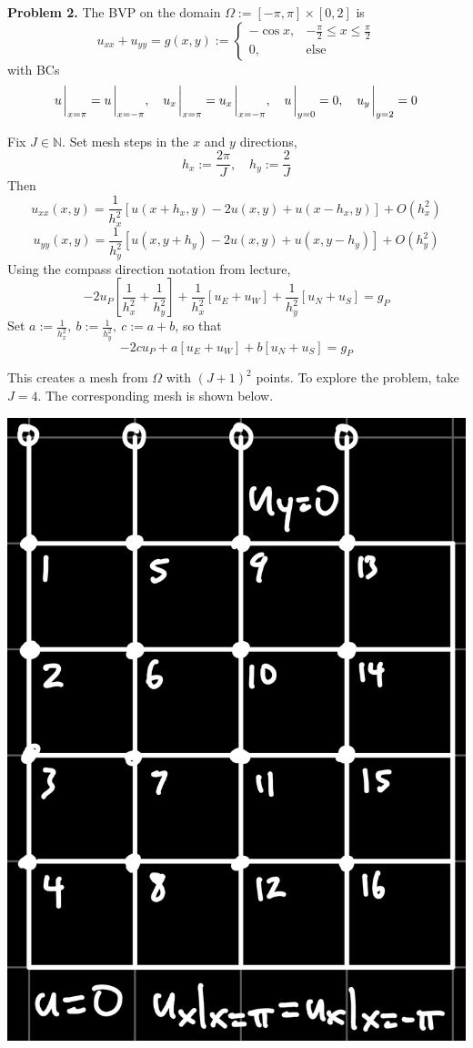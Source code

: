 \documentclass{article}
\def\mbb#1{\mathbb{#1}}
\def\tbf#1{\textbf{#1}}
\def\bN{\mbb{N}}
\newcommand{\sbr}[1]{\left[#1\right]}
\begin{document}
\tbf{Problem 2.} The BVP on the domain $\Omega:=[-\pi,\pi]\times[0,2]$ is
$$u_{xx} + u_{yy} = g(x,y) :=
\begin{cases}
	-\cos x, & -\frac\pi2 \le x \le \frac\pi2\\
	0, & \text{else}
\end{cases}$$
with BCs
$$u\eval_{x=\pi} = u\eval_{x=-\pi},
\quad u_x\eval_{x=\pi} = u_x\eval_{x=-\pi},
\quad u\eval_{y=0} = 0,
\quad u_y\eval_{y=2} = 0$$

Fix $J\in\bN$. Set mesh steps in the $x$ and $y$ directions,
$$h_x := \frac{2\pi}{J},
\quad h_y := \frac{2}{J}$$
Then
$$u_{xx}(x,y) = \frac{1}{h_x^2}\sbr{u(x+h_x,y) - 2u(x,y) + u(x-h_x,y)} + O(h_x^2)$$
$$u_{yy}(x,y) = \frac{1}{h_y^2}\sbr{u(x,y+h_y) - 2u(x,y) + u(x,y-h_y)} + O(h_y^2)$$
Using the compass direction notation from lecture,
$$-2u_P\sbr{\frac{1}{h_x^2} + \frac{1}{h_y^2}} + \frac{1}{h_x^2}[u_E + u_W] + \frac{1}{h_y^2}[u_N + u_S] = g_P$$
Set $a:=\frac{1}{h_x^2},~b:=\frac{1}{h_y^2},~c:=a+b$, so that
$$-2cu_P + a[u_E + u_W] + b[u_N + u_S] = g_P$$

This creates a mesh from $\Omega$ with $(J+1)^2$ points. To explore the problem, take $J=4$. The corresponding mesh is shown below.

\begin{center}
	\includegraphics[scale=.1]{hw6 2 grid}
\end{center}
\end{document}
